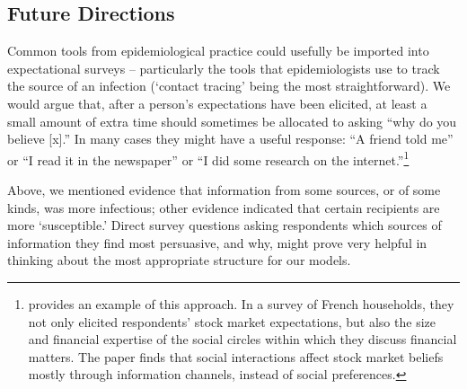 \subsection{Future Directions}\label{subsec:future}\hypertarget{future}{}

Common tools from epidemiological practice could usefully be imported into expectational surveys -- particularly the tools that epidemiologists use to track the source of an infection (`contact tracing' being the most straightforward).  We would argue that, after a person's expectations have been elicited, at least a small amount of extra time should sometimes be allocated to asking ``why do you believe [x].''  In many cases they might have a useful response: ``A friend told me'' or ``I read it in the newspaper'' or ``I did some research on the internet.''\footnote{\cite{arrondel2020informative} provides an example of this approach. In a survey of French households, they not only elicited respondents' stock market expectations, but also the size and financial expertise of the social circles within which they discuss financial matters. The paper finds that social interactions affect stock market beliefs mostly through information channels, instead of social  preferences.} %

Above, we mentioned evidence that information from some sources, or of some kinds, was more infectious;  other evidence indicated that certain recipients are more `susceptible.'  %
Direct survey questions asking respondents which sources of information they find most persuasive, and why, might prove very helpful in thinking about the most appropriate structure for our models.%

